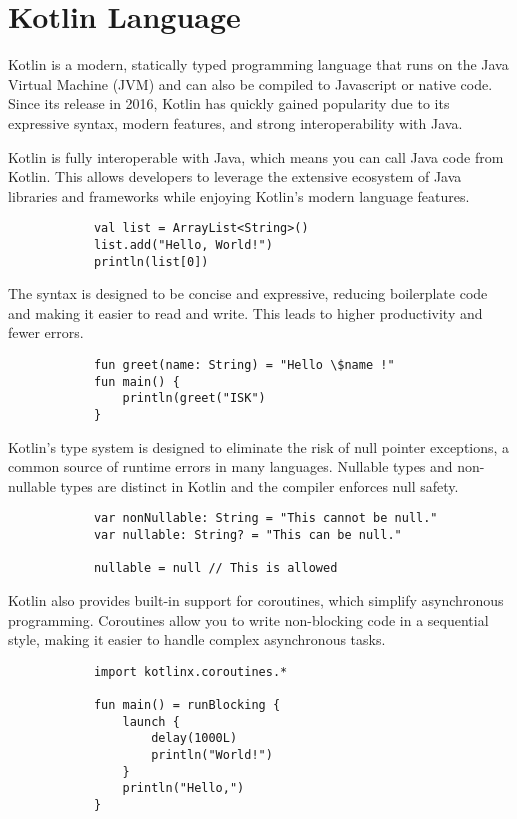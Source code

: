 \documentclass[10pt,twocolumn, a4paper]{article}
\begin{document}
\section{Kotlin Language}
Kotlin is a modern, statically typed programming language that runs on the Java Virtual Machine (JVM) and can also be compiled to Javascript or native code. Since its release in 2016, Kotlin has quickly gained popularity due to its expressive syntax, modern features, and strong interoperability with Java.

Kotlin is fully interoperable with Java, which means you can call Java code from Kotlin. This allows developers to leverage the extensive ecosystem of Java libraries and frameworks while enjoying Kotlin's modern language features.

\begin{lstlisting}
			val list = ArrayList<String>()
			list.add("Hello, World!")
			println(list[0])
		\end{lstlisting}

The syntax is designed to be concise and expressive, reducing boilerplate code and making it easier to read and write. This leads to higher productivity and fewer errors.

\begin{lstlisting}
			fun greet(name: String) = "Hello \$name !"
			fun main() {
				println(greet("ISK")
			}
		\end{lstlisting}

Kotlin's type system is designed to eliminate the risk of null pointer exceptions, a common source of runtime errors in many languages. Nullable types and non-nullable types are distinct in Kotlin and the compiler enforces null safety.

\begin{lstlisting}
			var nonNullable: String = "This cannot be null."
			var nullable: String? = "This can be null."

			nullable = null // This is allowed
		\end{lstlisting}

Kotlin also provides built-in support for coroutines, which simplify asynchronous programming. Coroutines allow you to write non-blocking code in a sequential style, making it easier to handle complex asynchronous tasks.

\begin{lstlisting}
			import kotlinx.coroutines.*

			fun main() = runBlocking {
				launch {
					delay(1000L)
					println("World!")
				}
				println("Hello,")
			}
		\end{lstlisting}
\end{document}
